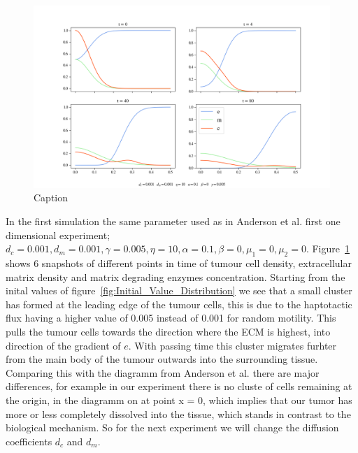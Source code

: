 \begin{figure}[h]
    \centering
    \includegraphics[width=\textwidth]{resources/images/2D_1e-3_1e-3_1e-3_10_0.1_0_0.005_1e-2_10_plot.png}
    \caption{Caption}
    \label{fig:0.001_0.001_0.001_10_0.1_0_0.005_0_0}
\end{figure}
In the first simulation the same parameter used as in Anderson et al. first one dimensional experiment; $d_c = 0.001, d_m = 0.001, \gamma = 0.005, \eta = 10, \alpha = 0.1, \beta = 0, \mu_1 = 0, \mu_2 = 0$. Figure~\ref{fig:0.001_0.001_0.001_10_0.1_0_0.005_0_0} shows 6 snapshots of different points in time of tumour cell density, extracellular matrix density and matrix degrading enzymes concentration. Starting from the inital values of figure~\ref{fig:Initial_Value_Distribution} we see that a small cluster has formed at the leading edge of the tumour cells, this is due to the haptotactic flux having a higher value of 0.005 instead of 0.001 for random motility. This pulls the tumour cells towards the direction where the ECM is highest, into direction of the gradient of $e$. With passing time this cluster migrates furhter from the main body of the tumour outwards into the surrounding tissue. Comparing this with the diagramm from Anderson et al. there are major differences, for example in our experiment there is no cluste of cells remaining at the origin, in the diagramm on at point x = 0, which implies that our tumor has more or less completely dissolved into the tissue, which stands in contrast to the biological mechanism. So for the next experiment we will change the diffusion coefficients $d_c$ and $d_m$.  

